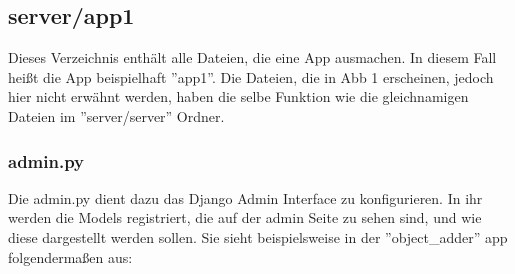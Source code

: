 \documentclass{article}
\begin{document}
\subsection{server/app1}
Dieses Verzeichnis enthält alle Dateien, die eine App ausmachen. In diesem Fall heißt die App beispielhaft ''app1''. Die Dateien, die in Abb 1 erscheinen, jedoch hier nicht erwähnt werden, haben die selbe Funktion wie die gleichnamigen Dateien im ''server/server'' Ordner.

\subsubsection{admin.py}
Die admin.py dient dazu das Django Admin Interface zu konfigurieren. In ihr werden die Models registriert, die auf der admin Seite zu sehen sind, und wie diese dargestellt werden sollen. Sie sieht beispielsweise in der ''object\_adder'' app folgendermaßen aus:
\end{document}

